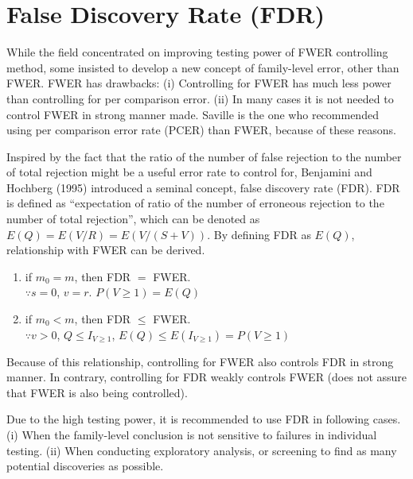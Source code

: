 \documentclass[a4paper, 11pt, oneside]{article}
\begin{document}
\section{False Discovery Rate (FDR)}
While the field concentrated on improving testing power of FWER controlling method, some insisted to develop a new concept of family-level error, other than FWER. FWER has drawbacks: (i) Controlling for FWER has much less power than controlling for per comparison error. (ii) In many cases it is not needed to control FWER in strong manner made. Saville is the one who recommended using per comparison error rate (PCER) than FWER, because of these reasons. \par
    Inspired by the fact that the ratio of the number of false rejection to the number of total rejection might be a useful error rate to control for, Benjamini and Hochberg (1995) introduced a seminal concept, false discovery rate (FDR). FDR is defined as \enquote{expectation of ratio of the number of erroneous rejection to the number of total rejection}, which can be denoted as $E(Q)=E(V/R)=E(V/(S+V))$. By defining FDR as $E(Q)$, relationship with FWER can be derived.
    \begin{enumerate}
    \item if $m_0=m$, then FDR $=$ FWER. \\
      $\because s=0$, $v=r$. $P(V \geq 1)= E(Q)$
    \item if $m_0<m$, then FDR $\leq$ FWER. \\
      $\because v>0$, $Q \leq I_{V \geq 1}$, $E(Q) \leq E(I_{V \geq 1}) = P(V \geq 1)$
    \end{enumerate}
Because of this relationship, controlling for FWER also controls FDR in strong manner. In contrary, controlling for FDR weakly controls FWER (does not assure that FWER is also being controlled). \par
    Due to the high testing power, it is recommended to use FDR in following cases. (i) When the family-level conclusion is not sensitive to failures in individual testing. (ii) When conducting exploratory analysis, or screening to find as many potential discoveries as possible.
\end{document}
